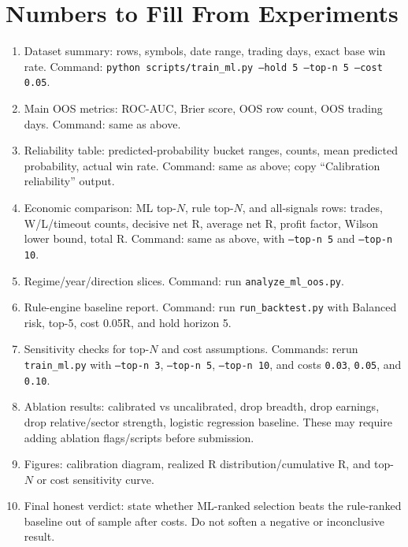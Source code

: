 \documentclass[11pt]{article}
\begin{document}
\section*{Numbers to Fill From Experiments}

\begin{enumerate}[leftmargin=*]
    \item Dataset summary: rows, symbols, date range, trading days, exact base
    win rate. Command: \texttt{python scripts/train\_ml.py --hold 5 --top-n 5 --cost 0.05}.
    \item Main OOS metrics: ROC-AUC, Brier score, OOS row count, OOS trading
    days. Command: same as above.
    \item Reliability table: predicted-probability bucket ranges, counts, mean
    predicted probability, actual win rate. Command: same as above; copy
    ``Calibration reliability'' output.
    \item Economic comparison: ML top-$N$, rule top-$N$, and all-signals rows:
    trades, W/L/timeout counts, decisive net R, average net R, profit factor,
    Wilson lower bound, total R. Command: same as above, with \texttt{--top-n 5}
    and \texttt{--top-n 10}.
    \item Regime/year/direction slices. Command:
    run \texttt{analyze\_ml\_oos.py}.
    \item Rule-engine baseline report. Command:
    run \texttt{run\_backtest.py} with Balanced risk, top-5, cost 0.05R,
    and hold horizon 5.
    \item Sensitivity checks for top-$N$ and cost assumptions. Commands:
    rerun \texttt{train\_ml.py} with \texttt{--top-n 3}, \texttt{--top-n 5},
    \texttt{--top-n 10}, and costs \texttt{0.03}, \texttt{0.05}, and
    \texttt{0.10}.
    \item Ablation results: calibrated vs uncalibrated, drop breadth, drop
    earnings, drop relative/sector strength, logistic regression baseline.
    These may require adding ablation flags/scripts before submission.
    \item Figures: calibration diagram, realized R distribution/cumulative R,
    and top-$N$ or cost sensitivity curve.
    \item Final honest verdict: state whether ML-ranked selection beats the
    rule-ranked baseline out of sample after costs. Do not soften a negative or
    inconclusive result.
\end{enumerate}
\end{document}
